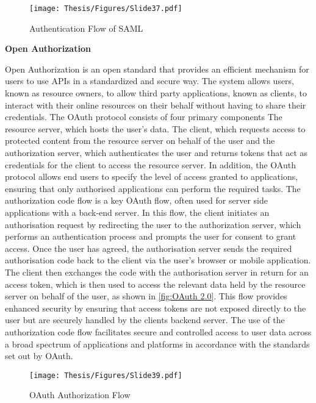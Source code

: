 \captionsetup{justification=centering}
\begin{figure}[h]
\centering
\texttt{[image: Thesis/Figures/Slide37.pdf]}
\caption{\label{fig:Security Assertion Markup Language (SAML)}Authentication Flow of SAML \cite{gross2003security}}
\end{figure}

\clearpage

\textbf{Open Authorization}

Open Authorization  is an open standard that provides an efficient mechanism for users to use APIs in a standardized and secure way. The system allows users, known as resource owners, to allow third party applications, known as clients, to interact with their online resources on their behalf without having to share their credentials. The OAuth protocol consists of four primary components The resource server, which hosts the user's data. The client, which requests access to protected content from the resource server on behalf of the user and the authorization server, which authenticates the user and returns tokens that act as credentials for the client to access the resource server. In addition, the OAuth protocol allows end users to specify the level of access granted to applications, ensuring that only authorised applications can perform the required tasks. The authorization code flow is a key OAuth flow, often used for server side applications with a back-end server. In this flow, the client initiates an authorisation request by redirecting the user to the authorization server, which performs an authentication process and prompts the user for consent to grant access. Once the user has agreed, the authorisation server sends the required authorisation code back to the client via the user's browser or mobile application. The client then exchanges the code with the authorisation server in return for an access token, which is then used to access the relevant data held by the resource server on behalf of the user, as shown in \autoref{fig:OAuth 2.0}. This flow provides enhanced security by ensuring that access tokens are not exposed directly to the user but are securely handled by the clients backend server. The use of the authorization code flow facilitates secure and controlled access to user data across a broad spectrum of applications and platforms in accordance with the standards set out by OAuth. \cite{ranjbar2012authentication}
 

\captionsetup{justification=centering}
\begin{figure}[h]
\centering
\texttt{[image: Thesis/Figures/Slide39.pdf]}
\caption{\label{fig:OAuth 2.0}OAuth Authorization Flow \cite{ranjbar2012authentication}}
\end{figure}

